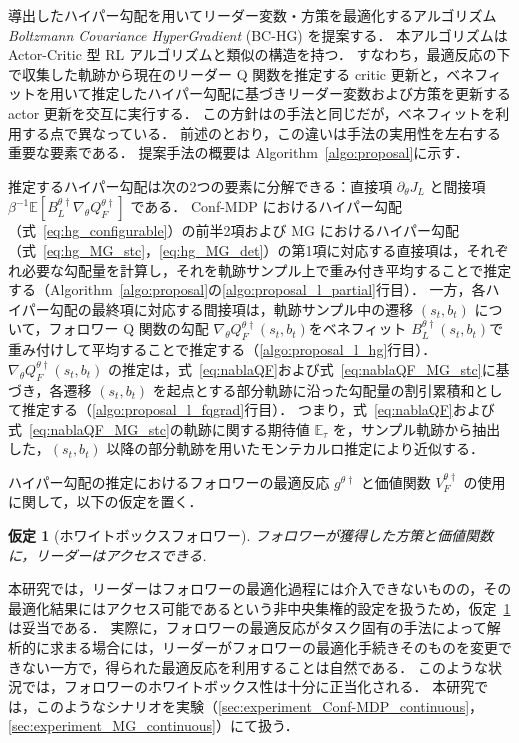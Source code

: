 \documentclass[originalpaper,fleqn]{jsaiart}     %
\providecommand{\E}{\mathbb{E}} %
\newtheorem{assumption}{仮定}
\begin{document}
導出したハイパー勾配を用いてリーダー変数・方策を最適化するアルゴリズム \emph{Boltzmann Covariance HyperGradient} (BC-HG) を提案する．
本アルゴリズムは Actor-Critic 型 RL アルゴリズムと類似の構造を持つ．
すなわち，最適反応の下で収集した軌跡から現在のリーダー Q 関数を推定する critic 更新と，ベネフィットを用いて推定したハイパー勾配に基づきリーダー変数および方策を更新する actor 更新を交互に実行する．
この方針は\cite{Thoma2024-em}の手法と同じだが，ベネフィットを利用する点で異なっている．
前述のとおり，この違いは手法の実用性を左右する重要な要素である．
提案手法の概要は Algorithm~\ref{algo:proposal}に示す．

推定するハイパー勾配は次の2つの要素に分解できる：直接項 $\partial_{\theta}J_L$ と間接項 $\beta^{-1}\E[B_L^{\theta\dagger}\nabla_{\theta}Q_F^{\theta\dagger}]$ である．
Conf-MDP におけるハイパー勾配（式~\eqref{eq:hg_configurable}）の前半2項および MG におけるハイパー勾配（式~\eqref{eq:hg_MG_stc}，\eqref{eq:hg_MG_det}）の第1項に対応する直接項は，それぞれ必要な勾配量を計算し，それを軌跡サンプル上で重み付き平均することで推定する（Algorithm~\ref{algo:proposal}の\ref{algo:proposal_l_partial}行目）．
一方，各ハイパー勾配の最終項に対応する間接項は，軌跡サンプル中の遷移 $(s_t,b_t)$ について，フォロワー Q 関数の勾配 $\nabla_{\theta}Q_F^{\theta\dagger}(s_t,b_t)$をベネフィット $B_L^{\theta\dagger}(s_t,b_t)$で重み付けして平均することで推定する（\ref{algo:proposal_l_hg}行目）．
$\nabla_{\theta}Q_F^{\theta\dagger}(s_t,b_t)$ の推定は，式~\eqref{eq:nablaQF}および式~\eqref{eq:nablaQF_MG_stc}に基づき，各遷移 $(s_t,b_t)$ を起点とする部分軌跡に沿った勾配量の割引累積和として推定する（\ref{algo:proposal_l_fqgrad}行目）．
つまり，式~\eqref{eq:nablaQF}および式~\eqref{eq:nablaQF_MG_stc}の軌跡に関する期待値 $\E_{\tau}$ を，サンプル軌跡から抽出した，$(s_t,b_t)$ 以降の部分軌跡を用いたモンテカルロ推定により近似する．

ハイパー勾配の推定におけるフォロワーの最適反応 $g^{\theta\dag}$ と価値関数 $V_F^{\theta\dag}$ の使用に関して，以下の仮定を置く．
\begin{assumption}[ホワイトボックスフォロワー]\label{thm:assume_wb_follower}
    フォロワーが獲得した方策と価値関数に，リーダーはアクセスできる.
\end{assumption}

本研究では，リーダーはフォロワーの最適化過程には介入できないものの，その最適化結果にはアクセス可能であるという非中央集権的設定を扱うため，仮定~\ref{thm:assume_wb_follower}は妥当である．
実際に，フォロワーの最適反応がタスク固有の手法によって解析的に求まる場合には，リーダーがフォロワーの最適化手続きそのものを変更できない一方で，得られた最適反応を利用することは自然である．
このような状況では，フォロワーのホワイトボックス性は十分に正当化される．
本研究では，このようなシナリオを実験（\ref{sec:experiment_Conf-MDP_continuous}，\ref{sec:experiment_MG_continuous}）にて扱う．
\end{document}
